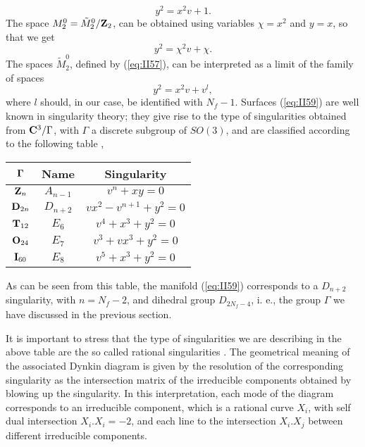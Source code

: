 \begin{equation}
y^2 = x^2 v +1.
\label{eq:II57b}
\end{equation}
The space $M_2^0=\tilde{M}_2^0/{\bf Z}_2$, can be obtained using
variables $\chi=x^2$ and $y=x$, so that we get
\begin{equation}
y^2 = \chi^2 v + \chi.
\label{eq:II58}
\end{equation}
The spaces $\tilde{M}_2^0$, defined by (\ref{eq:II57}), can be
interpreted as a limit of the family of spaces
\begin{equation}
y^2 = x^2 v +v^l,
\label{eq:II59}
\end{equation}
where $l$ should, in our case, be identified with $N_f-1$.
Surfaces (\ref{eq:II59}) are well known in singularity theory;
they give rise to the type of singularities obtained from ${\bf
C}^3/\Gamma$, with $\Gamma$ a discrete subgroup of $SO(3)$, and
are classified according to the following table \cite{Arnold},

\begin{center}

\begin{tabular}{|c|c|c|}     \hline\hline
	 ${\bf \Gamma}$         & {\bf Name}  &  {\bf Singularity}     \\ \hline
	 ${\bf Z}_n$            & $A_{n-1}$   &  $v^n+xy=0$            \\ 
	 ${\bf D}_{2n}$         & $D_{n+2}$   &  $vx^2-v^{n+1}+y^2=0$  \\  
	 ${\bf T}_{12}$         & $E_6$       &  $v^4+x^3+y^2=0$       \\  
	 ${\bf O}_{24}$         & $E_7$       &  $v^3+vx^3+y^2=0$      \\ 
	 ${\bf I}_{60}$         & $E_8$       &  $v^5+x^3+y^2=0$       \\ \hline\hline

\end{tabular}
\label{tab:3}
\end{center}

  
As can be seen from this table, the manifold (\ref{eq:II59})
corresponds to a $D_{n+2}$ singularity, with $n=N_f-2$, and
dihedral group $D_{2N_f-4}$, i. e., the group $\Gamma$ we have
discussed in the previous section.
  
It is important to stress that the type of singularities we are
describing in the above table are the so called rational
singularities \cite{Artin}. The geometrical meaning of the associated Dynkin
diagram is given by the resolution of the corresponding
singularity as the intersection matrix of the irreducible
components obtained by blowing up the singularity. In this
interpretation, each mode of the diagram corresponds to an
irreducible component, which is a rational curve $X_i$, with self
dual intersection $X_i . X_i=-2$, and each line to the
intersection $X_i . X_j$ between different irreducible
components.  
  
